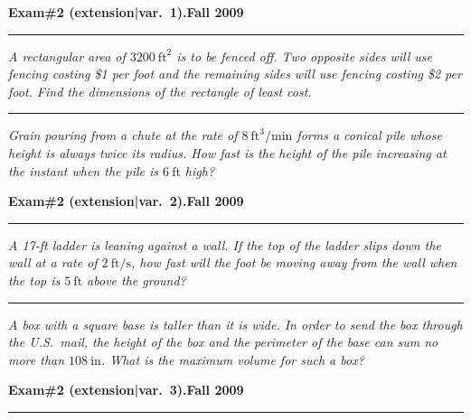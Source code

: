 \documentclass[12pt]{article}
\begin{document}
\hfill{\large\bf Exam\#2
  (extension|var.~1).}\hfill{\large\bf Fall 2009}\hrule 

\bigskip
{\problem[15 pts] \em A rectangular area of $3200~\text{ft}^2$ is to
  be fenced off.  Two opposite sides will use fencing costing \$1 per
  foot and the remaining sides will use fencing costing \$2 per foot.
  Find the dimensions of the rectangle of least cost.}
\vspace{7.5cm}
\begin{flushright}
\end{flushright}
\hrule
{\problem[15 pts] \em Grain pouring from a chute at the rate of
  $8~\text{ft}^3/\text{min}$ forms a conical pile whose height is
  always twice its radius.  How fast is the height of the pile
  increasing at the instant when the pile is $6~\text{ft}$ high?}
\vspace{8.5cm}
\begin{flushright}
\end{flushright}
\newpage
\hfill{\large\bf Exam\#2
  (extension|var.~2).}\hfill{\large\bf Fall 2009}\hrule 

\bigskip
{\problem[15 pts] \em A 17-ft ladder is leaning against a wall.  If
  the top of the ladder slips down the wall at a rate of
  $2~\text{ft}/\text{s}$, how fast will the foot be moving away from
  the wall when the top is $5~\text{ft}$ above the ground?}
\vspace{7.5cm}
\begin{flushright}
\end{flushright}
\hrule
{\problem[15 pts] \em A box with a square base is taller than it is
  wide.  In order to send the box through the U.S.~mail, the height of
  the box and the perimeter of the base can sum no more than
  $108~\text{in}$.  What is the maximum volume for such a box?}
\vspace{8.5cm}
\begin{flushright}
\end{flushright}
\newpage
\hfill{\large\bf Exam\#2
  (extension|var.~3).}\hfill{\large\bf Fall 2009}\hrule 
\end{document}
